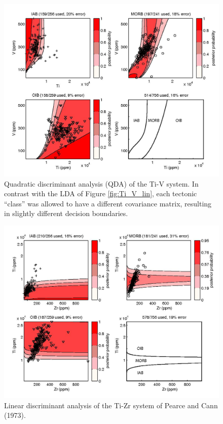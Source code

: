 \begin{figure}[htbp]
  \centering
  \includegraphics[width=600]{figures/Ti_V_quad.jpg}
  \caption[Quadratic discriminant analysis of the Ti-V system]
{Quadratic discriminant analysis (QDA) of the Ti-V system. In contrast
with the LDA of Figure \ref{fig:Ti_V_lin}, each tectonic ``class'' was
allowed to  have a different covariance matrix,  resulting in slightly
different decision boundaries.}
  \label{fig:Ti_V_quad}
\end{figure}

\begin{figure}[htbp]
  \centering
  \includegraphics[width=600]{figures/Ti_Zr_lin.jpg}
  \caption[Linear discriminant analysis of the Ti-Zr system of Pearce and Cann (1973)]
{Linear discriminant analysis of the Ti-Zr system of Pearce and Cann (1973).}
  \label{fig:Ti_Zr_lin}
\end{figure}


